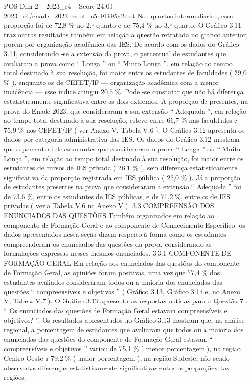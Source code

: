 \begin{textsample}{POS Dim 2 – 2023\_c4 – Score 24.00 – 2023\_c4/enade\_2023\_zoot\_a5e91995a2.txt}
Nos quartos intermediários, essa proporção foi de 72,8 \% no 2.º quarto e de 75,4 \% no 3.º quarto.
O Gráfico 3.11 traz outros resultados também em relação à questão retratada no gráfico anterior, porém por organização acadêmica das IES.
De acordo com os dados do Gráfico 3.11, considerando -se a extensão da prova, o percentual de estudantes que avaliaram a prova como “ Longa ” ou “ Muito Longa ”, em relação ao tempo total destinado à sua resolução, foi maior entre os estudantes de faculdades ( 29,0 \% ), enquanto os de CEFET/IF — organização acadêmica com a menor incidência — esse índice atingiu 20,6 \%.
Pode -se constatar que não há diferença estatisticamente significativa entre os dois extremos.
A proporção de presentes, na prova do Enade 2023, que consideraram a sua extensão “ Adequada ”, em relação ao tempo total destinado à sua resolução, esteve entre 66,7 \% nas faculdades e 75,9 \% nos CEFET/IF ( ver Anexo V, Tabela V.6 ).
O Gráfico 3.12 apresenta os dados por categoria administrativa das IES.
Os dados do Gráfico 3.12 mostram que o percentual de estudantes que consideraram a prova “ Longa ” ou “ Muito Longa ”, em relação ao tempo total destinado à sua resolução, foi maior entre os estudantes de cursos de IES privada ( 26,1 \% ), sem diferença estatisticamente significativa da proporção registrada em IES pública ( 23,0 \% ).
Já a proporção de estudantes presentes na prova que consideraram a extensão “ Adequada ” foi de 73,6 \%, entre os estudantes de IES públicas, e de 71,2 \%, entre os de IES privadas ( ver a Tabela V.6 no Anexo V ). 3.3 COMPREENSÃO DOS ENUNCIADOS DAS QUESTÕES Também organizados em relação ao componente de Formação Geral e ao componente de Conhecimento Específico, os dados apresentados nesta seção dizem respeito à forma como os estudantes compreenderam os enunciados das questões da prova, considerando as formulações expressas nesses mesmos enunciados. 3.3.1 COMPONENTE DE FORMAÇÃO GERAL Em relação aos enunciados das questões do componente de Formação Geral, as opiniões foram positivas, uma vez que 77,4 \% dos estudantes avaliados consideraram todos ou a maioria dos enunciados das questões “ compreensíveis e objetivos ” ( Gráfico 3.13, Gráfico 3.14 e, no Anexo V, Tabela V.7 ).
O Gráfico 3.13 apresenta as respostas obtidas para a Questão 7 : “ Os enunciados das questões de Formação Geral estavam compreensíveis e objetivos? ”.
Os resultados apresentados no Gráfico 3.13 mostram que, na análise regional, a porcentagem de estudantes que avaliaram que todos ou a maioria dos enunciados das questões do componente de Formação Geral estavam “ compreensíveis e objetivos ” variou de 75,1 \% ( menor porcentagem ), na região Centro-Oeste a 79,2 \% ( maior porcentagem ), na região Sudeste, não sendo observadas diferenças estatisticamente significativas entre as proporções das regiões.

\end{textsample}
